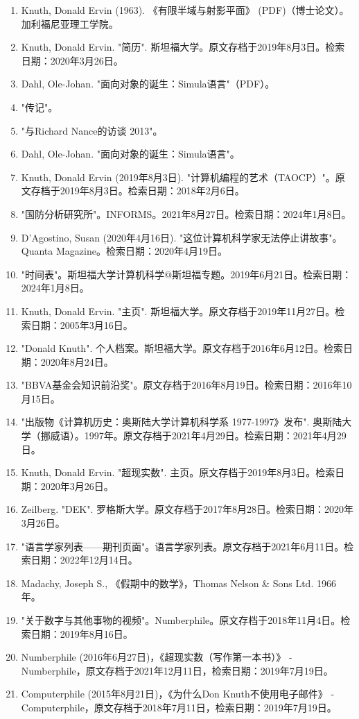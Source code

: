 \begin{enumerate}
\item Knuth, Donald Ervin (1963). 《有限半域与射影平面》 (PDF)（博士论文）。加利福尼亚理工学院。
\item Knuth, Donald Ervin. "简历". 斯坦福大学。原文存档于2019年8月3日。检索日期：2020年3月26日。
\item Dahl, Ole-Johan. "面向对象的诞生：Simula语言"（PDF）。
\item "传记"。
\item "与Richard Nance的访谈 2013"。
\item Dahl, Ole-Johan. "面向对象的诞生：Simula语言"。
\item Knuth, Donald Ervin (2019年8月3日). "计算机编程的艺术（TAOCP）"。原文存档于2019年8月3日。检索日期：2018年2月6日。
\item "国防分析研究所"。INFORMS。2021年8月27日。检索日期：2024年1月8日。
\item D'Agostino, Susan (2020年4月16日). "这位计算机科学家无法停止讲故事"。Quanta Magazine。检索日期：2020年4月19日。
\item "时间表"。斯坦福大学计算机科学@斯坦福专题。2019年6月21日。检索日期：2024年1月8日。
\item Knuth, Donald Ervin. "主页". 斯坦福大学。原文存档于2019年11月27日。检索日期：2005年3月16日。
\item "Donald Knuth". 个人档案。斯坦福大学。原文存档于2016年6月12日。检索日期：2020年8月24日。
\item "BBVA基金会知识前沿奖"。原文存档于2016年8月19日。检索日期：2016年10月15日。
\item "出版物《计算机历史：奥斯陆大学计算机科学系 1977-1997》发布". 奥斯陆大学（挪威语）。1997年。原文存档于2021年4月29日。检索日期：2021年4月29日。
\item Knuth, Donald Ervin. "超现实数". 主页。原文存档于2019年8月3日。检索日期：2020年3月26日。
\item Zeilberg. "DEK". 罗格斯大学。原文存档于2017年8月28日。检索日期：2020年3月26日。
\item "语言学家列表——期刊页面"。语言学家列表。原文存档于2021年6月11日。检索日期：2022年12月14日。
\item Madachy, Joseph S., 《假期中的数学》，Thomas Nelson & Sons Ltd. 1966年。
\item "关于数字与其他事物的视频"。Numberphile。原文存档于2018年11月4日。检索日期：2019年8月16日。
\item Numberphile (2016年6月27日)，《超现实数（写作第一本书）》 - Numberphile，原文存档于2021年12月11日，检索日期：2019年7月19日。
\item Computerphile (2015年8月21日)，《为什么Don Knuth不使用电子邮件》 - Computerphile，原文存档于2018年7月11日，检索日期：2019年7月19日。

\end{enumerate}
